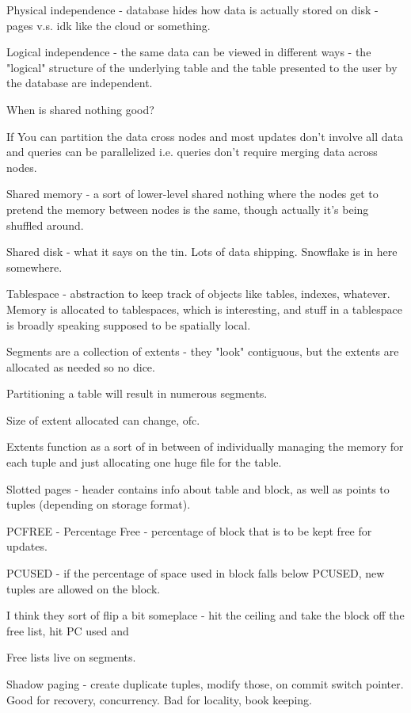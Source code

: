 \documentclass{article}
\begin{document}
		Physical independence - database hides how data is actually stored on disk - pages v.s. idk like the cloud or something.
		
		Logical independence - the same data can be viewed in different ways - the "logical" structure of the underlying table and the table presented to the user by the database are independent.
		
		When is shared nothing good?
		
		If You can partition the data cross nodes and most updates don't involve all data and queries can be parallelized i.e. queries don't require merging data across nodes.
		
		Shared memory - a sort of lower-level shared nothing where the nodes get to pretend the memory between nodes is the same, though actually it's being shuffled around.
		
		Shared disk - what it says on the tin. Lots of data shipping. Snowflake is in here somewhere.
		
		Tablespace - abstraction to keep track of objects like tables, indexes, whatever. Memory is allocated to tablespaces, which is interesting, and stuff in a tablespace is broadly speaking supposed to be spatially local.
		
		Segments are a collection of extents - they "look" contiguous, but the extents are allocated as needed so no dice.
		
		Partitioning a table will result in numerous segments.
		
		Size of extent allocated can change, ofc.
		
		Extents function as a sort of in between of individually managing the memory for each tuple and just allocating one huge file for the table.
		
		Slotted pages - header contains info about table and block, as well as points to tuples (depending on storage format).
		
		PCFREE - Percentage Free - percentage of block that is to be kept free for updates.
		
		PCUSED - if the percentage of space used in block falls below PCUSED, new tuples are allowed on the block.
		
		I think they sort of flip a bit someplace - hit the ceiling and take the block off the free list, hit PC used and 
		
		Free lists live on segments.
		
		Shadow paging - create duplicate tuples, modify those, on commit switch pointer. Good for recovery, concurrency. Bad for locality, book keeping.
		
\end{document}
